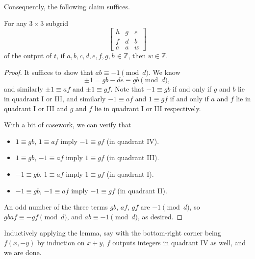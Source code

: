 Consequently, the following claim suffices.
\begin{claim*}
    For any $3\times3$ subgrid \[
        \begin{bmatrix}
            h&g&e\\ f&d&b\\ c&a&w
        \end{bmatrix}
    \]
    of the output of $t$, if $a,b,c,d,e,f,g,h\in\mathbb Z$, then $w\in\mathbb Z$.
\end{claim*}
\begin{proof}
    It suffices to show that $ab\equiv-1\pmod d$. We know \[\pm1=gb-de\equiv gb\pmod d,\]
    and similarly $\pm1\equiv af$ and $\pm1\equiv gf$. Note that $-1\equiv gb$ if and only if $g$ and $b$ lie in quadrant I or III, and similarly $-1\equiv af$ and $1\equiv gf$ if and only if $a$ and $f$ lie in quadrant I or III and $g$ and $f$ lie in quadrant I or III respectively.

    With a bit of casework, we can verify that
    \begin{itemize}[itemsep=0em]
        \item $1\equiv gb$, $1\equiv af$ imply $-1\equiv gf$ (in quadrant IV).
        \item $1\equiv gb$, $-1\equiv af$ imply $1\equiv gf$ (in quadrant III).
        \item $-1\equiv gb$, $1\equiv af$ imply $1\equiv gf$ (in quadrant I).
        \item $-1\equiv gb$, $-1\equiv af$ imply $-1\equiv gf$ (in quadrant II).
    \end{itemize}
    An odd number of the three terms $gb$, $af$, $gf$ are $-1\pmod d$, so $gbaf\equiv-gf\pmod d$, and $ab\equiv-1\pmod d$, as desired.
\end{proof}

Inductively applying the lemma, say with the bottom-right corner being $f(x,-y)$ by induction on $x+y$, $f$ outputs integers in quadrant IV as well, and we are done.
